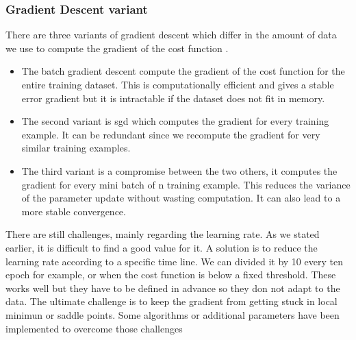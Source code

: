 \subsubsection{Gradient Descent variant}
There are three variants of gradient descent which differ in the amount of data we use to compute the gradient of the cost function \cite{gradient}. 
\begin{itemize}
    \item The batch gradient descent compute the gradient of the cost function for the entire training dataset. This is computationally efficient and gives a stable error gradient but it is intractable if the dataset does not fit in memory. 
    \item The second variant is \gls{sgd} which computes the gradient for every training example. It can be redundant since we recompute the gradient for very similar training examples.
    \item The third variant is a compromise between the two others, it computes the gradient for every mini batch of n training example. This reduces the variance of the parameter update without wasting computation. It can also lead to a more stable convergence.
\end{itemize}There are still challenges, mainly regarding the learning rate. As we stated earlier, it is difficult to find a good value for it. A solution is to reduce the learning rate according to a specific time line. We can divided it by 10 every ten epoch for example, or when the cost function is below a fixed threshold. These works well but they have to be defined in advance so they don not adapt to the data. The ultimate challenge is to keep the gradient from getting stuck in local minimun or saddle points. Some algorithms or additional parameters have been implemented to overcome those challenges
